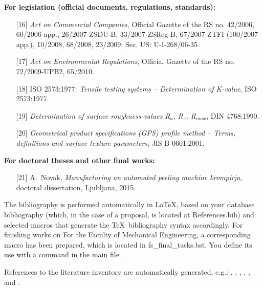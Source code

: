 \textbf{For legislation (official documents, regulations, standards):}
\begin{itemize}
\item[{[16]}] \emph{Act on Commercial Companies}, Official Gazette of the RS no.
42/2006, 60/2006 app., 26/2007-ZSDU-B, 33/2007-ZSReg-B, 67/2007-ZTFI
(100/2007
app.), 10/2008, 68/2008, 23/2009; Sec. US: U-I-268/06-35.\\

\item[{[17]}] \emph{Act on Environmental Regulations}, Official Gazette of the RS no.
72/2009-UPB2, 65/2010.\\

\item[{[18]}] {ISO 2573:1977}: \emph{Tensile testing systems –
Determination of
K-value}, {ISO 2573:1977}.\\

\item[{[19]}] \emph{Determination of surface roughness values R$_a$, R$_z$,
R$_{max}$}, {DIN 4768:1990}.\\

\item[{[20]}] \emph{Geometrical product specifications (GPS) profile method
–
Terms, definitions and surface texture parameters}, {JIS B 0601:2001}.
\end{itemize}

\textbf{For doctoral theses and other final works:}
\begin{itemize}
\item[{[21]}] A.~Novak, \emph{Manufacturing an automated peeling machine
krompirja}, doctoral dissertation, Ljubljana, 2015.
\end{itemize}

The bibliography is performed automatically in \LaTeX, based on your database
bibliography (which, in the case of a proposal, is located at References.bib) and selected
macros that generate the \TeX~bibliography syntax accordingly. For finishing works on
For the Faculty of Mechanical Engineering, a corresponding macro has been prepared, which is located in
fs\_final\_tasks.bst. You define its use with a command
\verb|| in the main file.

References to the literature inventory are automatically generated, e.g.: \cite{bazant_1991},
\cite{Doe_1991}, \cite{Bazant_2008}, \cite{Gonzalez_2014, Bazant_2005}
\cite{Bazant_2007, Kogoj_DTD, Merkur_2005, SURS_2009, SURS_2005, MKariera,
Encyclopedia, Posl_app, ZGD, ZOP}, \cite{ISO_2573}, \cite{DIN_4768} and
\cite{JISB0601, Novak_2015}.
